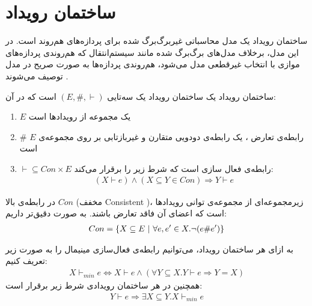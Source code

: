 \section{ساختمان رویداد}
ساختمان رویداد%
\cite{es}
یک مدل محاسباتی%
غیر‌برگ‌برگ شده%
برای پردازه‌های هم‌روند%
است.
در این مدل، برخلاف مدل‌های برگ‌برگ شده%
مانند سیستم‌انتقال که هم‌روندی پردازه‌های موازی با انتخاب غیرقطعی مدل می‌شود، هم‌روندی پردازه‌ها به صورت صریح در مدل توصیف می‌شوند
\cite{sassone1996models}.
\begin{definition}{ساختمان رویداد}
    یک ساختمان رویداد یک سه‌تایی
    $(E,\#,\vdash)$
    است که در آن:
    \begin{enumerate}
        \item $E$
              یک مجموعه از رویداد‌ها است
        \item $\#$
              رابطه‌ی تعارض%
              ، یک رابطه‌ی دودویی متقارن و غیربازتابی بر روی مجموعه‌ی
              $E$
              است
        \item $\vdash \subseteq Con \times E$
              رابطه‌ی فعال سازی%
              است که شرط زیر را برقرار می‌کند:
              \begin{align*}
                  (X \vdash e) \wedge (X \subseteq Y \in Con)
                  \Rightarrow Y \vdash e
              \end{align*}
    \end{enumerate}
    در رابطه‌ی بالا
    $Con$
    (مخفف 
    Consistent
    )،
    زیرمجموعه‌ای از مجموعه‌ی توانی رویدادها است که اعضای آن فاقد تعارض باشند.
    به صورت دقیق‌تر داریم:
    \begin{align*}
        Con = \{X \subseteq E ~|~ \forall e,e' \in X. \neg(e\#e')\}
    \end{align*}
\end{definition}
\begin{definition}
    به ازای هر ساختمان رویداد، می‌توانیم رابطه‌ی فعال‌سازی مینیمال را به صورت زیر تعریف کنیم:
    \begin{align*}
        X \vdash_{min} e \iff X \vdash e \wedge
        ( \forall Y \subseteq X . Y \vdash e \Rightarrow Y = X )
    \end{align*}
    همچنین در هر ساختمان رویدادی شرط زیر برقرار است:
    \begin{align*}
        Y \vdash e \Rightarrow \exists X \subseteq Y . X \vdash_{min} e
    \end{align*}
\end{definition}

